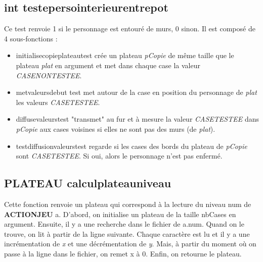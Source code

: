 \documentclass[a4]{article}
\begin{document}
\subsection{int teste\textunderscore perso\textunderscore interieur\textunderscore entrepot}
Ce test renvoie 1 si le personnage est entouré de murs, 0 sinon. Il est composé de 4 sous-fonctions : 
\begin{itemize}
\item initialise\textunderscore copie\textunderscore plateau\textunderscore test crée un plateau \textit{pCopie} de même taille que le plateau \textit{plat} en argument et met dans chaque case la valeur \emph{CASE\textunderscore NON\textunderscore TESTEE}.
\item met\textunderscore valeurs\textunderscore debut \textunderscore test met autour de la case en position du personnage de \textit{plat} les valeurs \emph{CASE\textunderscore TESTEE}.
\item diffuse\textunderscore valeurs\textunderscore test "transmet" au fur et à mesure la valeur \emph{CASE\textunderscore TESTEE} dans \textit{pCopie} aux cases voisines si elles ne sont pas des murs (de \textit{plat}).
\item test\textunderscore diffusion\textunderscore valeurs\textunderscore test regarde si les cases des bords du plateau de \textit{pCopie} sont \emph{CASE\textunderscore TESTEE}. Si oui, alors le personnage n'est pas enfermé.
\end{itemize}

\subsection{PLATEAU calcul\textunderscore plateau\textunderscore niveau}
Cette fonction renvoie un plateau qui correspond à la lecture du niveau num de \textbf{ACTIONJEU} a.
D'abord, on initialise un plateau de la taille nbCases en argument. Ensuite, il y a une recherche dans le fichier de a.num.
Quand on le trouve, on lit à partir de la ligne suivante. Chaque caractère est lu et il y a une incrémentation de \textit{x} et une décrémentation de \textit{y}.
Mais, à partir du moment où on passe à la ligne dans le fichier, on remet x à 0. 
Enfin, on retourne le plateau.
\end{document}
